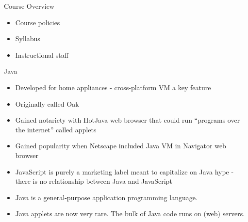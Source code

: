 \documentclass{beamer}
\author[Chris Simpkins]
{Christopher Simpkins \\\texttt{chris.simpkins@gatech.edu}}
\institute[Georgia Tech] %
\date[CS 1331]{}
\begin{document}
\begin{frame}
  \titlepage
\end{frame}

\begin{frame}[fragile]{Course Overview}

\begin{itemize}
\item Course policies
\item Syllabus
\item Instructional staff
\end{itemize}

\end{frame}

\begin{frame}[fragile]{Java}

\begin{itemize}
\item Developed for home appliances - cross-platform VM a key feature
\item Originally called Oak
\item Gained notariety with HotJava web browser that could run ``programs over the internet'' called applets
\item Gained popularity when Netscape included Java VM in Navigator web browser
\item JavaScript is purely a marketing label meant to capitalize on Java hype - there is no relationship between Java and JavaScript
\item  Java is a general-purpose application programming language.
\item Java applets are now very rare.  The bulk of Java code runs on (web) servers.
\end{itemize}

\end{frame}
\end{document}
